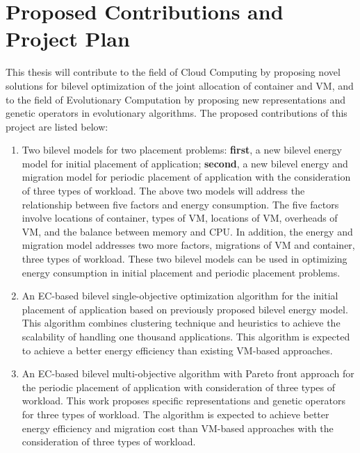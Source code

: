 \chapter{Proposed Contributions and Project Plan}\label{C:con}

This thesis will contribute to the field of Cloud Computing by proposing novel solutions for bilevel optimization of the joint allocation of container and VM, and to the field of Evolutionary Computation by proposing new representations and genetic operators in evolutionary algorithms. The proposed contributions of this project are listed below:
 
\begin{enumerate}
	\item Two bilevel models for two placement problems: \textbf{first}, a new bilevel energy model for initial placement of application; \textbf{second}, a new bilevel energy and migration model for periodic placement of application with the consideration of three types of workload. The above two models will address the relationship between five factors and energy consumption. The five factors involve locations of container, types of VM, locations of VM, overheads of VM, and the balance between memory and CPU. In addition, the energy and migration model addresses two more factors, migrations of VM and container, three types of workload. These two bilevel models can be used in optimizing energy consumption in initial placement and periodic placement problems.

	\item An EC-based bilevel single-objective optimization algorithm for the initial placement of application based on previously proposed bilevel energy model. This algorithm combines clustering technique and heuristics to achieve the scalability of handling one thousand applications. This algorithm is expected to achieve a better energy efficiency than existing VM-based approaches.

	\item An EC-based bilevel multi-objective algorithm with Pareto front approach for the periodic placement of application with consideration of three types of workload. 
	This work proposes specific representations and genetic operators for three types of workload. The algorithm is expected to achieve better energy efficiency and migration cost than VM-based approaches with the consideration of three types of workload. 


\end{enumerate}
